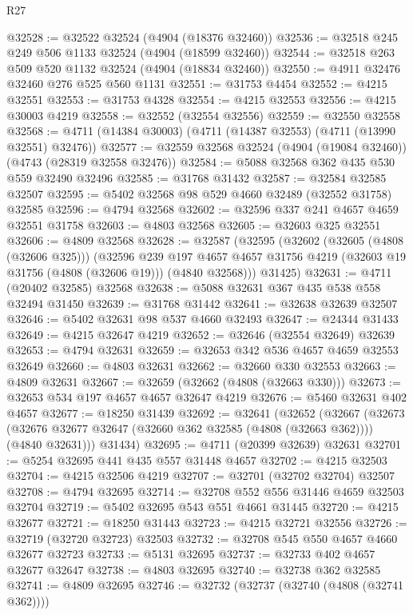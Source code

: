 \begin{lexlean}{R27}
\begin{coremodule}
@32528 := @32522 @32524 (@4904 (@18376 @32460))
@32536 := @32518 @245 @249 @506 @1133 @32524 (@4904 (@18599 @32460))
@32544 := @32518 @263 @509 @520 @1132 @32524 (@4904 (@18834 @32460))
@32550 := @4911 @32476 @32460 @276 @525 @560 @1131
@32551 := @31753 @4454
@32552 := @4215 @32551
@32553 := @31753 @4328
@32554 := @4215 @32553
@32556 := @4215 @30003 @4219
@32558 := @32552 (@32554 @32556)
@32559 := @32550 @32558
@32568 := @4711 (@14384 @30003) (@4711 (@14387 @32553) (@4711 (@13990 @32551) @32476))
@32577 := @32559 @32568 @32524 (@4904 (@19084 @32460)) (@4743 (@28319 @32558 @32476))
@32584 := @5088 @32568 @362 @435 @530 @559 @32490 @32496
@32585 := @31768 @31432
@32587 := @32584 @32585 @32507
@32595 := @5402 @32568 @98 @529 @4660 @32489 (@32552 @31758) @32585
@32596 := @4794 @32568
@32602 := @32596 @337 @241 @4657 @4659 @32551 @31758
@32603 := @4803 @32568
@32605 := @32603 @325 @32551
@32606 := @4809 @32568
@32628 := @32587
    (@32595
      (@32602
        (@32605 (@4808 (@32606 @325)))
        (@32596
          @239
          @197
          @4657
          @4657
          @31756
          @4219
          (@32603 @19 @31756 (@4808 (@32606 @19)))
          (@4840 @32568)))
      @31425)
@32631 := @4711 (@20402 @32585) @32568
@32638 := @5088 @32631 @367 @435 @538 @558 @32494 @31450
@32639 := @31768 @31442
@32641 := @32638 @32639 @32507
@32646 := @5402 @32631 @98 @537 @4660 @32493
@32647 := @24344 @31433
@32649 := @4215 @32647 @4219
@32652 := @32646 (@32554 @32649) @32639
@32653 := @4794 @32631
@32659 := @32653 @342 @536 @4657 @4659 @32553 @32649
@32660 := @4803 @32631
@32662 := @32660 @330 @32553
@32663 := @4809 @32631
@32667 := @32659 (@32662 (@4808 (@32663 @330)))
@32673 := @32653 @534 @197 @4657 @4657 @32647 @4219
@32676 := @5460 @32631 @402 @4657
@32677 := @18250 @31439
@32692 := @32641
    (@32652
      (@32667
        (@32673 (@32676 @32677 @32647 (@32660 @362 @32585 (@4808 (@32663 @362)))) (@4840 @32631)))
      @31434)
@32695 := @4711 (@20399 @32639) @32631
@32701 := @5254 @32695 @441 @435 @557 @31448 @4657
@32702 := @4215 @32503
@32704 := @4215 @32506 @4219
@32707 := @32701 (@32702 @32704) @32507
@32708 := @4794 @32695
@32714 := @32708 @552 @556 @31446 @4659 @32503 @32704
@32719 := @5402 @32695 @543 @551 @4661 @31445
@32720 := @4215 @32677
@32721 := @18250 @31443
@32723 := @4215 @32721 @32556
@32726 := @32719 (@32720 @32723) @32503
@32732 := @32708 @545 @550 @4657 @4660 @32677 @32723
@32733 := @5131 @32695
@32737 := @32733 @402 @4657 @32677 @32647
@32738 := @4803 @32695
@32740 := @32738 @362 @32585
@32741 := @4809 @32695
@32746 := @32732 (@32737 (@32740 (@4808 (@32741 @362))))

\end{coremodule}
\end{lexlean}
